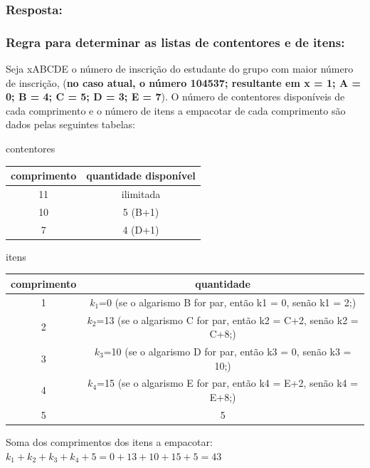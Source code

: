 \documentclass[12pt,a4paper]{report}
\begin{document}
    \subsubsection*{Resposta:}
    \subsubsection*{Regra para determinar as listas de contentores e de itens:}
    Seja xABCDE o número de inscrição do estudante do grupo com maior número de inscrição, (\textbf{no caso atual, o número 104537; resultante em x = 1; A = 0; B = 4; C = 5; D = 3; E = 7}). O número de contentores disponíveis de cada comprimento e o número de itens
    a empacotar de cada comprimento são dados pelas seguintes tabelas:

    \begin{table}[h]
        \centering
        contentores \\
        \begin{tabular}{|c|c|}
        \hline
        \textbf{comprimento} & \textbf{quantidade disponível} \\
        \hline
        11 & ilimitada \\
        10 & 5 (B+1) \\
        7 & 4 (D+1) \\
        \hline
        \end{tabular}
    \end{table}

    \begin{table}[h]
        \centering
        itens \\
        \begin{tabular}{|c|c|}
        \hline
        \textbf{comprimento} & \textbf{quantidade} \\
        \hline
        1 & $k_1$=0 (se o algarismo B for par, então k1 = 0, senão k1 = 2;) \\
        2 & $k_2$=13 (se o algarismo C for par, então k2 = C+2, senão k2 = C+8;) \\
        3 & $k_3$=10 (se o algarismo D for par, então k3 = 0, senão k3 = 10;) \\
        4 & $k_4$=15 (se o algarismo E for par, então k4 = E+2, senão k4 = E+8;) \\
        5 & 5 \\
        \hline
        \end{tabular}
    \end{table}

    Soma dos comprimentos dos itens a empacotar: $k_1 + k_2 + k_3 + k_4 + 5 = 0 + 13 + 10 + 15 + 5 = 43$
\end{document}
